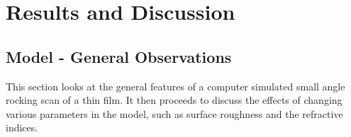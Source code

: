 \documentclass[10pt,twoside, b5paper,pdftex]{report}
\begin{document}
% 

\chapter{Results and Discussion}
 
\section{Model - General Observations}
This section looks at the general features of a computer simulated small angle rocking scan of a thin film. It then proceeds to discuss the effects of changing various parameters in the model, such as surface roughness and the refractive indices. 
\end{document}
